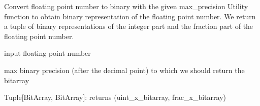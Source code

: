 \documentclass[letterpaper,10pt,english]{sphinxmanual}
\begin{document}

\begin{fulllineitems}
\label{\detokenize{utils:utils.bit_array_utils.float_to_bitarrays}}
\pysigstartsignatures
{}
\pysigstopsignatures
\sphinxAtStartPar
Convert floating point number to binary with the given max\_precision
Utility function to obtain binary representation of the floating point number.
We return a tuple of binary representations of the integer part and the fraction part of the
floating point number.
\begin{description}
\begin{description}
\sphinxAtStartPar
input floating point number

\sphinxAtStartPar
max binary precision (after the decimal point) to which we should return the bitarray

\end{description}

\sphinxAtStartPar
Tuple{[}BitArray, BitArray{]}: returns (uint\_x\_bitarray, frac\_x\_bitarray)

\end{description}

\end{fulllineitems}

\end{document}
